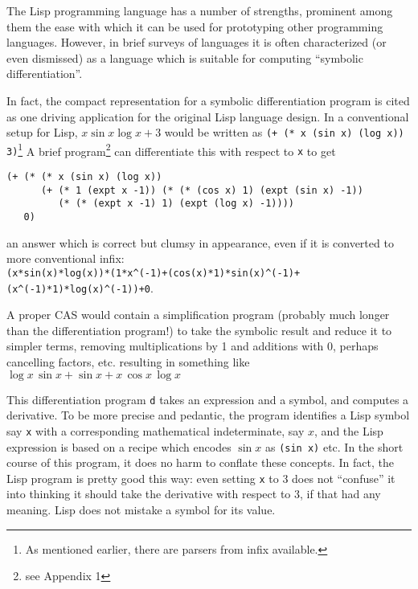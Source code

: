 \documentclass{article}
\begin{document}
{The Lisp programming language has a number of strengths, prominent
among them the ease with which it can be used for prototyping other
programming languages. However, in brief surveys of languages
it is often characterized (or even dismissed) as
a language which is suitable for computing ``symbolic differentiation''.}

In fact, the compact representation for a symbolic differentiation
program is cited as one driving application for the original Lisp
language design.  In a conventional setup for Lisp, $x \sin x \log x
+3$ would be written as {\tt (+ (* x (sin x) (log x)) 3)}\footnote{As
mentioned earlier, there are parsers from infix available.}
A brief program\footnote{see Appendix 1} can differentiate this with
respect to {\tt x} to get
\begin{verbatim}
(+ (* (* x (sin x) (log x))
      (+ (* 1 (expt x -1)) (* (* (cos x) 1) (expt (sin x) -1))
         (* (* (expt x -1) 1) (expt (log x) -1))))
   0)
\end{verbatim}
an answer which is correct but clumsy in appearance, even if it is
converted to more conventional infix:\\
{\verb|(x*sin(x)*log(x))*(1*x^(-1)+(cos(x)*1)*sin(x)^(-1)+(x^(-1)*1)*log(x)^(-1))+0|}.

A proper CAS would contain a simplification
program (probably much longer than the differentiation program!)
to take the symbolic result and reduce it to simpler terms,
removing multiplications by 1 and additions with 0, perhaps cancelling
factors, etc. resulting in something like $ \log x\,\sin x+\sin
x+x\,\cos x\,\log x $

This differentiation program {\tt d} takes an expression and a symbol, and
computes a derivative.  To be more precise and pedantic, the program
identifies a Lisp symbol say
 {\tt x}
with a corresponding mathematical indeterminate, say $x$, and the Lisp expression
is based on a recipe which encodes  $\sin x$ as  {\tt (sin x)} etc.
In the short course of this program, it does no harm to conflate
these concepts.  In fact, the Lisp program is pretty good this way:
even setting {\tt x} to 3 does not ``confuse'' it into thinking it should
take the derivative with respect to 3, if that had any meaning. Lisp does
not mistake a symbol for its value.
\end{document}
